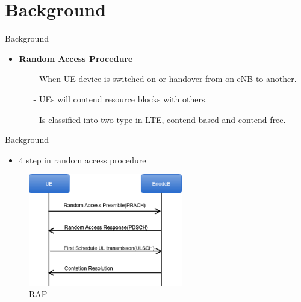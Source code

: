 \documentclass{beamer}
\begin{document}
\section{Background}
\begin{frame}{Background}
\begin{itemize}
    \item \textbf{Random Access Procedure}
    \begin{itemize}
        \item [-]{When UE device is switched on or handover from on eNB to another.}
        \item[-]{UEs will contend resource blocks with others.}
        \item[-]{Is classified into two type in LTE, contend based and contend free.}
    \end{itemize}
\end{itemize}

\end{frame}
\begin{frame}{Background}
    \begin{itemize}
    \item{4 step in random access procedure}
    \end{itemize}
    \begin{figure}[t]
        \centering
        \includegraphics[width=0.6\textwidth]{figures/rach.png}
        \caption{RAP}
    \end{figure}
\end{frame}

\end{document}
